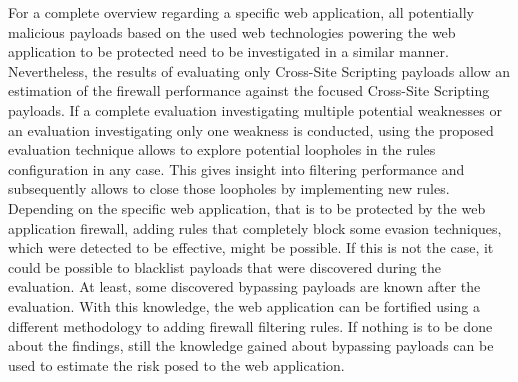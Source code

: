For a complete overview regarding a specific web application, all potentially malicious payloads based on the used web technologies powering the web application to be protected need to be investigated in a similar manner. Nevertheless, the results of evaluating only Cross-Site Scripting payloads allow an estimation of the firewall performance against the focused Cross-Site Scripting payloads.
If a complete evaluation investigating multiple potential weaknesses or an evaluation investigating only one weakness is conducted, using the proposed evaluation technique allows to explore potential loopholes in the rules configuration in any case. This gives insight into filtering performance and subsequently allows to close those loopholes by implementing new rules.
Depending on the specific web application, that is to be protected by the web application firewall, adding rules that completely block some evasion techniques, which were detected to be effective, might be possible. If this is not the case, it could be possible to blacklist payloads that were discovered during the evaluation. At least, some discovered bypassing payloads are known after the evaluation.
With this knowledge, the web application can be fortified using a different methodology to adding firewall filtering rules. If nothing is to be done about the findings, still the knowledge gained about bypassing payloads can be used to estimate the risk posed to the web application.

